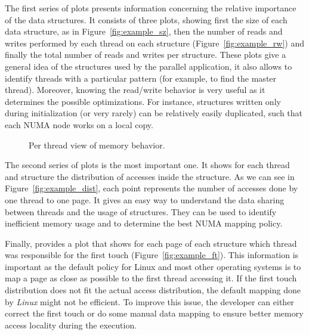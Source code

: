 The first series of plots presents information concerning the relative
importance of the data structures. It consists of three plots, showing first the
size of each data structure, as in Figure~\ref{fig:example_sz}, then the
number of reads and writes performed by each thread on each structure (Figure~\ref{fig:example_rw}) and
finally the total number of reads and writes per structure. These plots give a
general idea of the structures used by the parallel application, it also allows to identify
threads with a particular pattern (for example, to find the master thread).
Moreover, knowing the read/write behavior is very
useful as it determines the possible optimizations. For instance, structures
written only during initialization (or very rarely) can be relatively easily
duplicated, such that each NUMA node works on a local copy.

\begin{figure}[htb]
    \centering
    \caption{Per thread view of memory behavior.}
    \label{fig:example_plot2}
\end{figure}

The second series of plots is the most important one. It shows for each thread
and structure the distribution of accesses inside the structure. As we
can see in Figure~\ref{fig:example_dist}, each point represents the number of
accesses done by one thread to one page. It gives an easy way to understand the data
sharing between threads and the usage of structures. They can be used to identify
inefficient memory usage and to determine the best NUMA mapping policy.



Finally, \TABARNAC provides a plot that shows for each page of each structure
which thread was responsible for the first touch
(Figure~\ref{fig:example_ft}). This information is important as the
default policy for Linux and most other operating systems is to map a page as close as possible to the first
thread accessing it. If the first touch distribution does not fit the actual
access distribution, the default mapping done by \emph{Linux} might not be
efficient. To improve this issue, the developer can either correct the first
touch or do some manual data mapping to ensure better memory access locality
during the execution.

